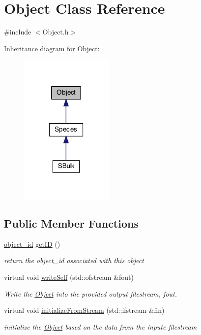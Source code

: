 \hypertarget{classObject}{\section{Object Class Reference}
\label{classObject}
}


{\ttfamily \#include $<$Object.\-h$>$}



Inheritance diagram for Object\-:\nopagebreak
\begin{figure}[H]
\begin{center}
\leavevmode
\includegraphics[width=130pt]{classObject__inherit__graph}
\end{center}
\end{figure}
\subsection*{Public Member Functions}
\begin{DoxyCompactItemize}
\item 
\hyperlink{Object_8h_a0b56ddf6ace42572542aae1f2c364e05}{object\-\_\-id} \hyperlink{classObject_a4dd34b912b01d62f8e5aa9bcb4e82e81}{get\-I\-D} ()
\begin{DoxyCompactList}\small\item\em return the object\-\_\-id associated with this object \end{DoxyCompactList}\item 
virtual void \hyperlink{classObject_a3f41123d1b33b22e5eb71fd2794577d9}{write\-Self} (std\-::ofstream \&fout)
\begin{DoxyCompactList}\small\item\em Write the \hyperlink{classObject}{Object} into the provided output filestream, fout. \end{DoxyCompactList}\item 
virtual void \hyperlink{classObject_a7695d57d88356ed2649255a48e4ffdbe}{initialize\-From\-Stream} (std\-::ifstream \&fin)
\begin{DoxyCompactList}\small\item\em initialize the \hyperlink{classObject}{Object} based on the data from the inpute filestream \end{DoxyCompactList}\end{DoxyCompactItemize}
